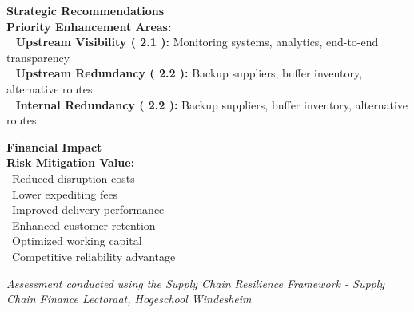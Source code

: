 \documentclass[
  oneside,
  open=any,
  fontsize=11pt]{article}
\begin{document}
\vspace{0.4cm}

\begin{minipage}[t]{0.58\textwidth}
\textbf{Strategic Recommendations}\\
\footnotesize\textbf{Priority Enhancement Areas:}\\
\textbullet\ \textbf{ Upstream Visibility  ( 2.1 ):} Monitoring systems, analytics, end-to-end transparency\\
\textbullet\ \textbf{ Upstream Redundancy  ( 2.2 ):} Backup suppliers, buffer inventory, alternative routes\\
\textbullet\ \textbf{ Internal Redundancy  ( 2.2 ):} Backup suppliers, buffer inventory, alternative routes\\
\end{minipage}\hfill
\begin{minipage}[t]{0.38\textwidth}
\textbf{Financial Impact}\\
\footnotesize\textbf{Risk Mitigation Value:}\\
\textbullet\ Reduced disruption costs\\
\textbullet\ Lower expediting fees\\
\textbullet\ Improved delivery performance\\
\textbullet\ Enhanced customer retention\\
\textbullet\ Optimized working capital\\
\textbullet\ Competitive reliability advantage\\
\end{minipage}

\vfill
\begin{center}
\footnotesize\textit{Assessment conducted using the Supply Chain Resilience Framework - Supply Chain Finance Lectoraat, Hogeschool Windesheim}
\end{center}
\end{document}
